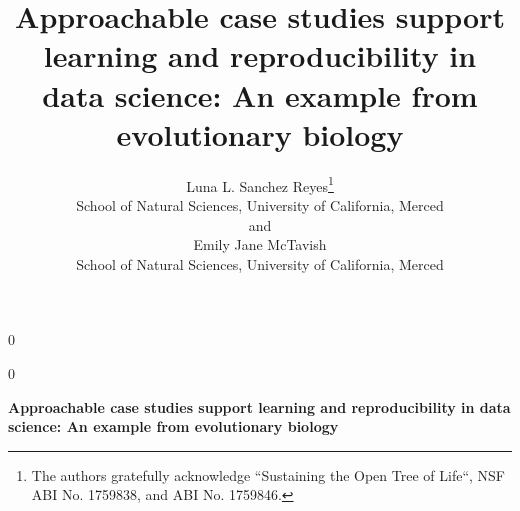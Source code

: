 \documentclass[12pt]{article}
\newcommand{\blind}{0}
\begin{document}
%
%


\def\spacingset#1{\renewcommand{\baselinestretch}%
{#1}\small\normalsize} \spacingset{1}



\blind
{
  \title{\bf Approachable case studies support learning and reproducibility in data science: An example from evolutionary biology}
  \author{Luna L. Sanchez Reyes\thanks{
    The authors gratefully acknowledge ``Sustaining the Open Tree of Life``, NSF ABI No. 1759838, and ABI No. 1759846.}\hspace{.2cm}\\
    School of Natural Sciences, University of California, Merced\\
    and \\
    Emily Jane McTavish \\
    School of Natural Sciences, University of California, Merced}
  \maketitle
} \fi

\blind
{
  \bigskip
  \bigskip
  \bigskip
  \begin{center}
    {\LARGE\bf Approachable case studies support learning and reproducibility in data science: An example from evolutionary biology}
\end{center}
  \medskip
} \fi
\end{document}
